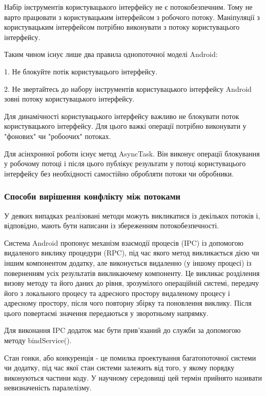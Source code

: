 Набір інструментів користувацького інтерфейсу не є потокобезпечним. Тому не варто працювати з користувацьким інтерфейсом з робочого потоку. Маніпуляції з користувацьким інтерфейсом потрібно виконувати з потоку користувацього інтерфейсу. 

Таким чином існує лише два правила однопоточної моделі Android:

1. Не блокуйте потік користувацього інтерфейсу.

2. Не звертайтесь до набору інструментів користувацького інтерфейсу Android зовні потоку користувацького інтерфейсу.

Для динамічності користувацького інтерфейсу важливо не блокувати поток користувацького інтерфейсу. Для цього важкі операції потрібно виконувати у "фонових" чи  "робоочих" потоках.

Для асінхронної роботи існує метод AsyncTask. Він виконує операції блокування у робочому потоці і після цього публікує результати у потоці користувацього інтерфейсу без необхідності самостійно обробляти потоки чи обробники. \cite{androiddevelopers}

\subsubsection{Способи вирішення конфлікту між потоками}

У деяких випадках реалізовані методи можуть викликатися із декількох потоків і, відповідно, мають бути написани із збереженням потокобезпечності.

Система Android пропонує механізм взаємодії процесів (IPC) із допомогою видаленого виклику процедури (RPC), під час якого метод викликається дією чи іншим компонентом додатку, але виконується видаленно (у іншому процесі) із поверненням усіх результатів викликаючему компоненту. Це викликає розділення визову методу та його даних до рівня, зрозумілого операційній системі, передачу його з локального процесу та адресного простору видаленому процесу і адресному простору, після чого повторну збірку та поновлення виклику. Після цього повертаємі значення передаються у зворотньому напрямку. 

Для виконання IPC додаток має бути прив'язаний до служби за допомогою методу bindService(). \cite{androiddevelopers}

Стан гонки, або конкуренція - це помилка проектування багатопоточної системи чи додатку, під час якої стан системи залежить від того, у якому порядку виконуються частини коду. У научному середовищі цей термін прийнято називати невизначеність паралелізму. \cite{jonathan2005linux}

